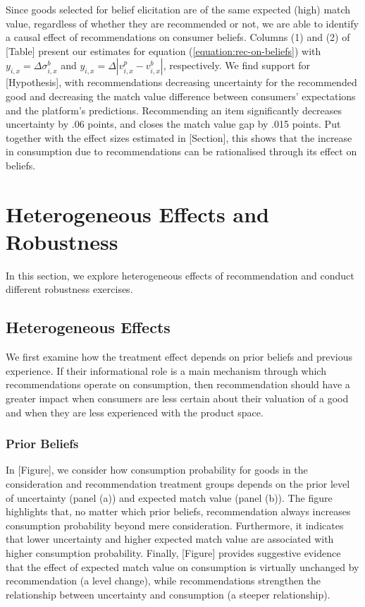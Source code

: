 \documentclass[12pt]{article}
\theoremstyle{newtheorem}
\begin{document}
Since goods selected for belief elicitation are of the same expected (high) match value, regardless of whether they are recommended or not, we are able to identify a causal effect of recommendations on consumer beliefs. 
Columns (1) and (2) of [Table] present our estimates for equation (\ref{equation:rec-on-beliefs}) with $y_{i,x}=\Delta \sigma_{i,x}^b$ and $y_{i,x}=\Delta |v_{i,x}^p-v_{i,x}^b|$, respectively. 
We find support for [Hypothesis], with recommendations decreasing uncertainty for the recommended good and decreasing the match value difference between consumers' expectations and the platform's predictions.
Recommending an item significantly decreases uncertainty by .06 points, and closes the match value gap by .015 points. 
Put together with the effect sizes estimated in [Section], this shows that the increase in consumption due to recommendations can be rationalised through its effect on beliefs. 





\section{Heterogeneous Effects and Robustness}

In this section, we explore heterogeneous effects of recommendation and conduct different robustness exercises. 

\subsection{Heterogeneous Effects}
\label{section:robustness:heterogeneity}

We first examine how the treatment effect depends on prior beliefs and previous experience.
If their informational role is a main mechanism through which recommendations operate on consumption, then recommendation should have a greater impact when consumers are less certain about their valuation of a good and when they are less experienced with the product space.


\subsubsection{Prior Beliefs}

In [Figure], we consider how consumption probability for goods in the consideration and recommendation treatment groups depends on the prior level of uncertainty (panel (a)) and expected match value (panel (b)).
The figure highlights that, no matter which prior beliefs, recommendation always increases consumption probability beyond mere consideration.
Furthermore, it indicates that lower uncertainty and higher expected match value are associated with higher consumption probability.
Finally, [Figure] provides suggestive evidence that the effect of expected match value on consumption is virtually unchanged by recommendation (a level change), while recommendations strengthen the relationship between uncertainty and consumption (a steeper relationship).
\end{document}
